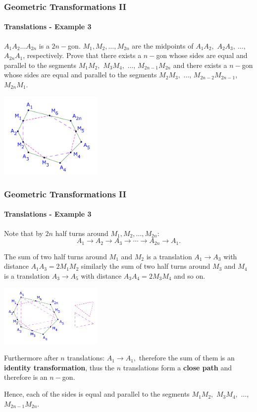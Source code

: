 \documentclass[8pt,xcolor=table,dvipsnames]{beamer}
\begin{document}
\begin{frame}[t]
    \frametitle{Geometric Transformations II}
    \framesubtitle{Translations - Example 3}
    \begin{example}
        $A_1A_2 \ldots A_{2n}$ is a $2n-$gon. $M_1, M_2, \ldots, M_{2n}$ are the midpoints of $A_1A_2,$ $A_2A_3,\ \ldots,$ $A_{2n}A_1$, respectively.
        Prove that there exists a $n-$gon whose sides are equal and parallel to the segments $M_1M_2,$ $M_3M_4,$ $\ldots$, $M_{2n-1}M_{2n}$
        and there exists a $n-$gon whose sides are equal and parallel to the segments $M_2M_3,$ $\ldots$, $M_{2n-2}M_{2n-1}$, $M_{2n}M_1.$ 
    \end{example}

    \begin{center}
        \includegraphics[width=5cm]{./svg/pdf/translation-3a.pdf}
    \end{center}
\end{frame}

\begin{frame}[t]
    \frametitle{Geometric Transformations II}
    \framesubtitle{Translations - Example 3}
    Note that by $2n$ half turns around $M_1, M_2, \ldots, M_{2n}$:
    \[
        A_1 \rightarrow A_2 \rightarrow A_3 \rightarrow  \cdots \rightarrow  A_{2n} \rightarrow A_1.
    \]
    
    The sum of two half turns around $M_1$ and $M_2$ is a translation $A_1 \rightarrow A_3$ with distance $A_1A_3 = 2 M_1M_2$
    similarly the sum of two half turns around $M_3$ and $M_4$ is a translation $A_3 \rightarrow A_5$ with distance $A_3A_4 = 2 M_3M_4$
    and so on.

    \begin{center}
        \includegraphics[width=5cm]{./svg/pdf/translation-3b.pdf}
    \end{center}

    Furthermore after $n$ translations: $A_1 \rightarrow A_1,$ therefore the sum of them is an \textbf{identity transformation},
    thus the $n$ translations form a \textbf{close path} and therefore is an $n-$gon.

    \bigbreak
    Hence, each of the sides is equal and parallel to the segments $M_1M_2,$ $M_3M_4,$ $\ldots$, $M_{2n-1}M_{2n}$.
\end{frame}
\end{document}
